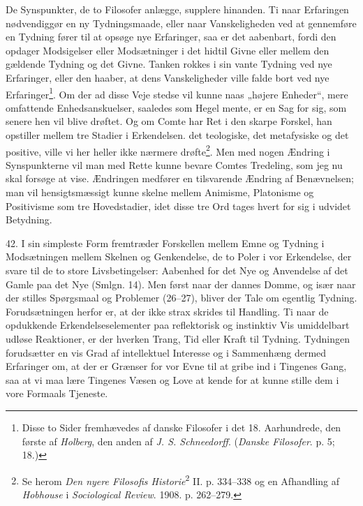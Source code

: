 \documentclass[12pt,a4paper]{book}
\newcommand{\apage}[1]{\marginnote{\footnotesize\textit{[#1]}}}
\begin{document}
De Synspunkter, de to Filosofer anlægge, supplere hinanden. Ti naar
Erfaringen nødvendiggør en ny Tydningsmaade, eller naar Vanskeligheden
ved at gennemføre en Tydning fører til at opsøge nye Erfaringer, saa er
det aabenbart, fordi den opdager Modsigelser eller Modsætninger i det
hidtil Givne eller mellem den gældende Tydning og det Givne. Tanken
rokkes i sin vante Tydning ved nye Erfaringer, eller den haaber, at dens
Vanskeligheder ville falde bort ved nye Erfaringer\footnote{Disse to
Sider fremhævedes af danske Filosofer i det 18. Aarhundrede, den første
af \emph{Holberg}, den anden af \emph{J. S. Schneedorff}. (\emph{Danske
Filosofer}. p. 5; 18.)}. Om der ad disse Veje stedse vil \apage{113} kunne naas
„højere Enheder“, mere omfattende Enhedsanskuelser, saaledes som Hegel
mente, er en Sag for sig, som senere hen vil blive drøftet. Og om Comte
har Ret i den skarpe Forskel, han opstiller mellem tre Stadier i
Erkendelsen. det teologiske, det metafysiske og det positive, ville vi
her heller ikke nærmere drøfte\footnote{Se herom \emph{Den nyere
Filosofis Historie}\textsuperscript{2} II. p. 334--338 og en Afhandling
af \emph{Hobhouse} i \emph{Sociological Review}. 1908. p. 262--279.}. Men
med nogen Ændring i Synspunkterne vil man med Rette kunne bevare Comtes
Tredeling, som jeg nu skal forsøge at vise. Ændringen medfører en
tilsvarende Ændring af Benævnelsen; man vil hensigtsmæssigt kunne skelne
mellem Animisme, Platonisme og Positivisme som tre Hovedstadier, idet
disse tre Ord tages hvert for sig i udvidet Betydning.

42. I sin simpleste Form fremtræder Forskellen mellem Emne og Tydning i
Modsætningen mellem Skelnen og Genkendelse, de to Poler i vor
Erkendelse, der svare til de to store Livsbetingelser: Aabenhed for det
Nye og Anvendelse af det Gamle paa det Nye (Smlgn. 14). Men først naar
der dannes Domme, og især naar der stilles Spørgsmaal og Problemer
(26--27), bliver der Tale om egentlig Tydning. Forudsætningen herfor er,
at der ikke strax skrides til Handling. Ti naar de opdukkende
Erkendelseselementer paa reflektorisk og instinktiv Vis umiddelbart
udløse Reaktioner, er der hverken Trang, Tid eller Kraft til Tydning.
Tydningen forudsætter en vis Grad af intellektuel Interesse og i
Sammenhæng dermed Erfaringer om, at der er Grænser for vor Evne til at
gribe ind i Tingenes Gang, saa at vi maa lære Tingenes Væsen og Love at
kende for at kunne stille dem i vore Formaals Tjeneste.
\end{document}
